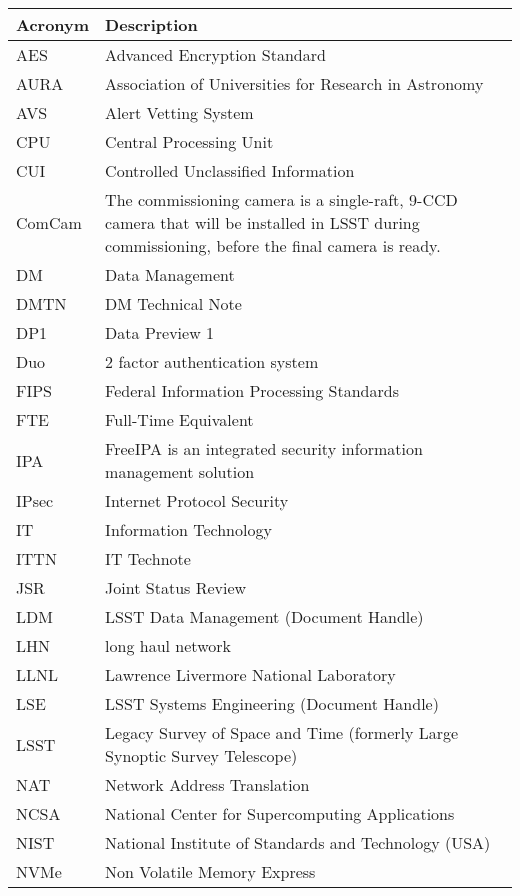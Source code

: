 \addtocounter{table}{-1}
\begin{longtable}{p{}p{}}\hline
\textbf{Acronym} & \textbf{Description}  \\\hline

AES & Advanced Encryption Standard \\\hline
AURA & Association of Universities for Research in Astronomy \\\hline
AVS & Alert Vetting System \\\hline
CPU & Central Processing Unit \\\hline
CUI & Controlled Unclassified Information \\\hline
ComCam & The commissioning camera is a single-raft, 9-CCD camera that will be installed in LSST during commissioning, before the final camera is ready. \\\hline
DM & Data Management \\\hline
DMTN & DM Technical Note \\\hline
DP1 & Data Preview 1 \\\hline
Duo & 2 factor authentication system \\\hline
FIPS & Federal Information Processing Standards \\\hline
FTE & Full-Time Equivalent \\\hline
IPA & FreeIPA is an integrated security information management solution \\\hline
IPsec & Internet Protocol Security \\\hline
IT & Information Technology \\\hline
ITTN & IT Technote \\\hline
JSR & Joint Status Review \\\hline
LDM & LSST Data Management (Document Handle) \\\hline
LHN & long haul network \\\hline
LLNL & Lawrence Livermore National Laboratory \\\hline
LSE & LSST Systems Engineering (Document Handle) \\\hline
LSST & Legacy Survey of Space and Time (formerly Large Synoptic Survey Telescope) \\\hline
NAT & Network Address Translation \\\hline
NCSA & National Center for Supercomputing Applications \\\hline
NIST & National Institute of Standards and Technology (USA) \\\hline
NVMe & Non Volatile Memory Express \\\hline

\end{longtable}
